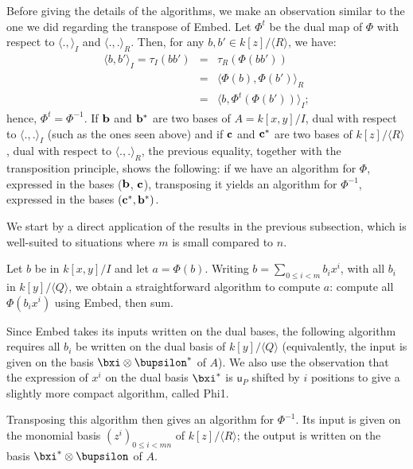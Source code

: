 \documentclass{sig-alternate}
\def\vu {\ensuremath{\mathsf{u}}}
\newcounter{algo}
\newcommand{\ang}[1]{\langle#1\rangle}
\begin{document}
Before giving the details of the algorithms, we make an observation
similar to the one we did regarding the transpose of {\sf Embed}. Let
$\Phi^t$ be the dual map of $\Phi$ with respect to $\ang{.,}_I$ and
$\ang{.,.}_R$. Then, for any $b,b' \in k[z]/\ang{R}$, we have:
\begin{eqnarray*}
\ang{b,b'}_I=\tau_I(b b') &=&  \tau_R(\Phi(b b'))\\
&=& \ang{\Phi(b), \Phi(b')}_R \\
&=& \ang{b, \Phi^t(\Phi(b'))}_I;
\end{eqnarray*}
hence, $\Phi^t = \Phi^{-1}$. If ${\bf b}$ and ${\bf b}^\ast$ are two
bases of $A=k[x,y]/I$, dual with respect to $\ang{.,.}_I$ (such as the
ones seen above) and if ${\bf c}$ and ${\bf c}^\ast$ are two bases of
$k[z]/\ang{R}$, dual with respect to $\ang{.,.}_R$, the previous
equality, together with the transposition principle, shows the
following: if we have an algorithm for $\Phi$, expressed in the bases
(${\bf b}$, ${\bf c}$), transposing it yields an algorithm for
$\Phi^{-1}$, expressed in the bases $({\bf c}^\ast,{\bf b}^\ast)$.

\smallskip{}
We start by a direct application of the results in the previous
subsection, which is well-suited to situations where $m$ is small
compared to $n$.

Let $b$ be in $k[x,y]/I$ and let $a=\Phi(b)$. Writing $b=\sum_{0 \le i
  < m} b_i x^i$, with all $b_i$ in $k[y]/\ang{Q}$, we obtain a
straightforward algorithm to compute $a$: compute all $\Phi(b_i x^i)$
using {\sf Embed}, then sum.

Since {\sf Embed} takes its inputs written on the dual bases, the
following algorithm requires all $b_i$ be written on the dual basis of
$k[y]/\ang{Q}$ (equivalently, the input is given on the basis $\bxi
\otimes \bupsilon^\ast$ of $A$). We also use the observation that
the expression of $x^i$ on the dual basis $\bxi^\ast$ is $\vu_P$
shifted by $i$ positions to give a slightly more compact algorithm, 
called {\sf Phi1}.

Transposing this algorithm then gives an algorithm for
$\Phi^{-1}$. Its input is given on the monomial basis $(z^i)_{0 \le i
  < mn}$ of $k[z]/\ang{R}$; the output is written on the basis
$\bxi^\ast \otimes \bupsilon$ of $A$.
\end{document}
